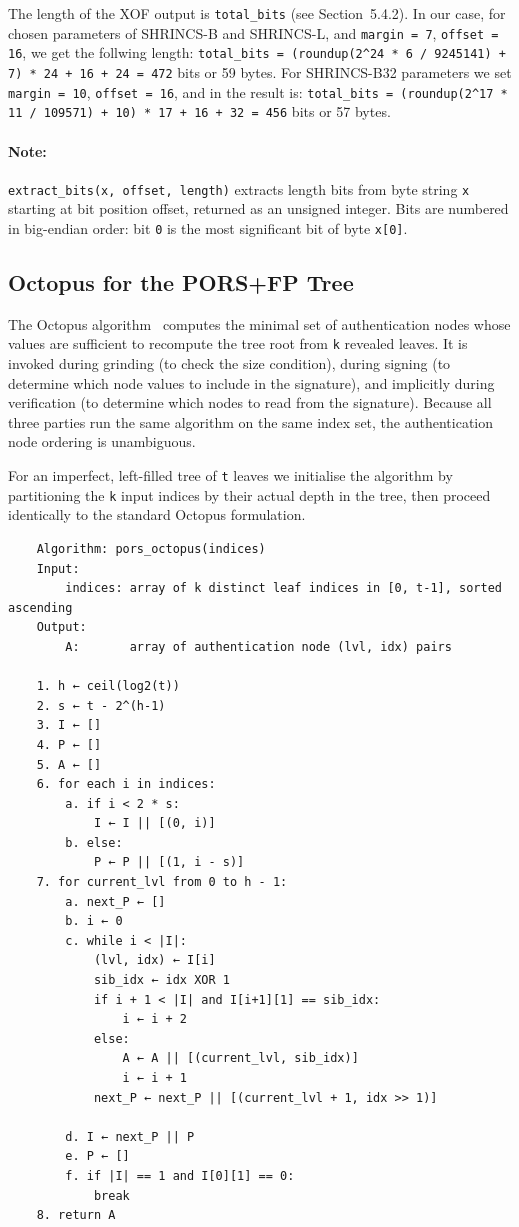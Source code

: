 The length of the XOF output is \texttt{total\_bits} (see Section~5.4.2). 
In our case, for chosen parameters of SHRINCS-B and SHRINCS-L, and \texttt{margin = 7}, \texttt{offset = 16}, we get the follwing length: \texttt{total\_bits = (roundup(2\string^24 * 6 / 9245141) + 7) * 24 + 16 + 24 = 472} bits or 59 bytes.
For SHRINCS-B32 parameters we set \texttt{margin = 10}, \texttt{offset = 16}, and in the result is: \texttt{total\_bits = (roundup(2\string^17 * 11 / 109571) + 10) * 17 + 16 + 32 = 456} bits or 57 bytes.

\paragraph{Note:} \texttt{extract\_bits(x, offset, length)} extracts length bits from byte string \texttt{x} starting at bit position offset, returned as an unsigned integer. Bits are numbered in big-endian order: bit \texttt{0} is the most significant bit of byte \texttt{x[0]}.

\subsection{Octopus for the PORS+FP Tree}
 
The Octopus algorithm~\cite{pors_octopus2018} computes the minimal set of authentication
nodes whose values are sufficient to recompute the tree root from \texttt{k} revealed
leaves. It is invoked during grinding (to check the size condition), during signing
(to determine which node values to include in the signature), and implicitly during
verification (to determine which nodes to read from the signature). Because all
three parties run the same algorithm on the same index set, the authentication node
ordering is unambiguous.
 
For an imperfect, left-filled tree of \texttt{t} leaves we initialise the algorithm by
partitioning the \texttt{k} input indices by their actual depth in the tree,
then proceed identically to the standard Octopus formulation.
 
\begin{verbatim}
    Algorithm: pors_octopus(indices)
    Input:
        indices: array of k distinct leaf indices in [0, t-1], sorted ascending
    Output:
        A:       array of authentication node (lvl, idx) pairs

    1. h ← ceil(log2(t))
    2. s ← t - 2^(h-1)
    3. I ← []
    4. P ← []
    5. A ← []
    6. for each i in indices:
        a. if i < 2 * s:
            I ← I || [(0, i)]
        b. else:
            P ← P || [(1, i - s)]          
    7. for current_lvl from 0 to h - 1:
        a. next_P ← []
        b. i ← 0
        c. while i < |I|:
            (lvl, idx) ← I[i]
            sib_idx ← idx XOR 1
            if i + 1 < |I| and I[i+1][1] == sib_idx:
                i ← i + 2
            else:
                A ← A || [(current_lvl, sib_idx)]
                i ← i + 1
            next_P ← next_P || [(current_lvl + 1, idx >> 1)]
            
        d. I ← next_P || P
        e. P ← []
        f. if |I| == 1 and I[0][1] == 0:
            break   
    8. return A
\end{verbatim}
 
